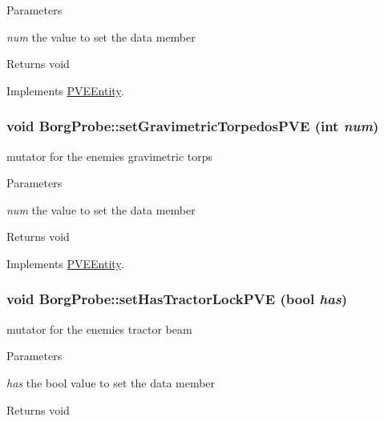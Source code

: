 \begin{DoxyParams}{Parameters}
\item[{\em num}]the value to set the data member\end{DoxyParams}
\begin{DoxyReturn}{Returns}
void 
\end{DoxyReturn}


Implements \hyperlink{classPVEEntity}{PVEEntity}.

\hypertarget{classBorgProbe_a992e10da14904a7ab14bc34ac9ec63ee}{
\subsubsection[{setGravimetricTorpedosPVE}]{\setlength{\rightskip}{0pt plus 5cm}void BorgProbe::setGravimetricTorpedosPVE (int {\em num})}}
\label{db/deb/classBorgProbe_a992e10da14904a7ab14bc34ac9ec63ee}
mutator for the enemies gravimetric torps


\begin{DoxyParams}{Parameters}
\item[{\em num}]the value to set the data member\end{DoxyParams}
\begin{DoxyReturn}{Returns}
void 
\end{DoxyReturn}


Implements \hyperlink{classPVEEntity}{PVEEntity}.

\hypertarget{classBorgProbe_ab38152299b9d34950bf4acd740544328}{
\subsubsection[{setHasTractorLockPVE}]{\setlength{\rightskip}{0pt plus 5cm}void BorgProbe::setHasTractorLockPVE (bool {\em has})}}
\label{db/deb/classBorgProbe_ab38152299b9d34950bf4acd740544328}
mutator for the enemies tractor beam


\begin{DoxyParams}{Parameters}
\item[{\em has}]the bool value to set the data member\end{DoxyParams}
\begin{DoxyReturn}{Returns}
void 
\end{DoxyReturn}


